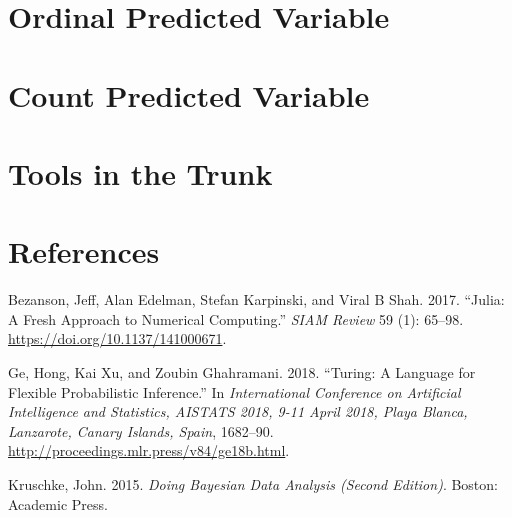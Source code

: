 \documentclass[
  letterpaper,
  DIV=11,
  numbers=noendperiod]{scrreprt}
\newlength{\cslhangindent}
\newlength{\cslentryspacingunit} %
\newenvironment{CSLReferences}[2] %
 {%
  \setlength{\parindent}{0pt}
  \ifodd #1
  \let\oldpar\par
  \def\par{\hangindent=\cslhangindent\oldpar}
  \fi
  \setlength{\parskip}{#2\cslentryspacingunit}
 }%
 {}
\begin{document}
\hypertarget{ordinal-predicted-variable}{%
\chapter{Ordinal Predicted Variable}\label{ordinal-predicted-variable}}


\hypertarget{count-predicted-variable}{%
\chapter{Count Predicted Variable}\label{count-predicted-variable}}


\hypertarget{tools-in-the-trunk}{%
\chapter{Tools in the Trunk}\label{tools-in-the-trunk}}


\hypertarget{references}{%
\chapter*{References}\label{references}}

\hypertarget{refs}{}
\begin{CSLReferences}{1}{0}
\leavevmode{}%
Bezanson, Jeff, Alan Edelman, Stefan Karpinski, and Viral B Shah. 2017.
{``Julia: A Fresh Approach to Numerical Computing.''} \emph{SIAM Review}
59 (1): 65--98. \url{https://doi.org/10.1137/141000671}.

\leavevmode{}%
Ge, Hong, Kai Xu, and Zoubin Ghahramani. 2018. {``Turing: A Language for
Flexible Probabilistic Inference.''} In \emph{International Conference
on Artificial Intelligence and Statistics, {AISTATS} 2018, 9-11 April
2018, Playa Blanca, Lanzarote, Canary Islands, Spain}, 1682--90.
\url{http://proceedings.mlr.press/v84/ge18b.html}.

\leavevmode{}%
Kruschke, John. 2015. \emph{Doing Bayesian Data Analysis (Second
Edition)}. Boston: Academic Press.

\end{CSLReferences}
\end{document}
